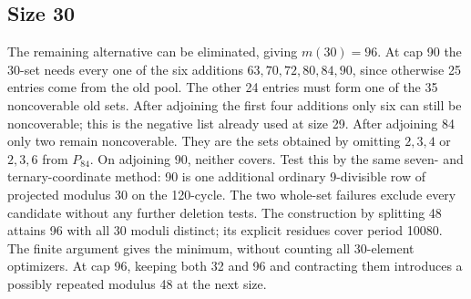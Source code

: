 \subsection*{Size 30}
The remaining alternative can be eliminated, giving $m(30)=96$. At cap 90 the 30-set needs every one of the six additions $63,70,72,80,84,90$, since otherwise 25 entries come from the old pool. The other 24 entries must form one of the 35 noncoverable old sets. After adjoining the first four additions only six can still be noncoverable; this is the negative list already used at size 29. After adjoining 84 only two remain noncoverable. They are the sets obtained by omitting $2,3,4$ or $2,3,6$ from $P_{84}$. On adjoining 90, neither covers. Test this by the same seven- and ternary-coordinate method: 90 is one additional ordinary 9-divisible row of projected modulus 30 on the 120-cycle. The two whole-set failures exclude every candidate without any further deletion tests. The construction by splitting 48 attains 96 with all 30 moduli distinct; its explicit residues cover period 10080. The finite argument gives the minimum, without counting all 30-element optimizers. At cap 96, keeping both 32 and 96 and contracting them introduces a possibly repeated modulus 48 at the next size.

